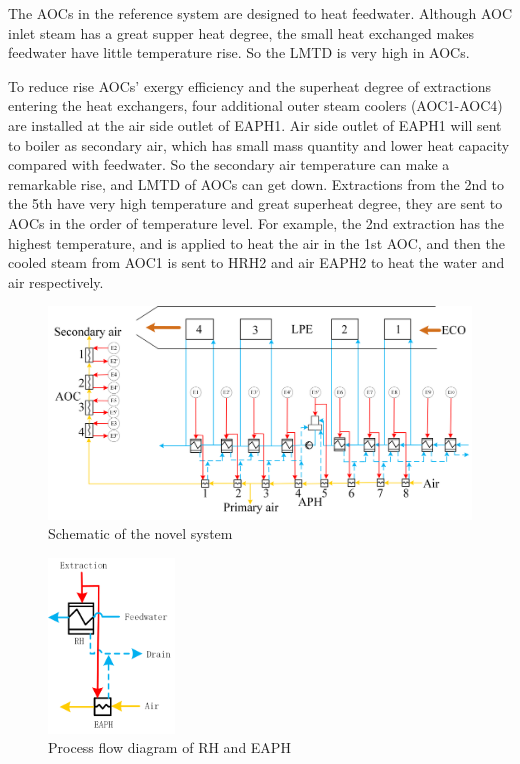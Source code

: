 \documentclass[preprint,12pt]{elsarticle}
\begin{document}
The AOCs in the reference system are designed to heat feedwater.
Although AOC inlet steam has a great supper heat degree, the small heat exchanged makes feedwater have little temperature rise.
So the LMTD is very high in AOCs.

To reduce rise AOCs' exergy efficiency and the superheat degree of extractions entering the heat exchangers, four additional outer steam coolers (AOC1-AOC4) are installed at the air side outlet of EAPH1.
Air side outlet of EAPH1 will sent to boiler as secondary air, which has small mass quantity and lower heat capacity compared with feedwater. 
So the secondary air temperature can make a remarkable rise, and LMTD of AOCs can get down.
Extractions from the 2nd to the 5th have very high temperature and great superheat degree, they are sent to AOCs in the order of temperature level.
For example, the 2nd extraction has the highest temperature, and is applied to heat the air in the 1st AOC, and then the cooled steam from AOC1 is sent to HRH2 and air EAPH2 to heat the water and air respectively.  

\begin{figure}[htbp]
\centering
\includegraphics[width=1\textwidth]{fig/novel_system.png}
\caption{Schematic of the novel system} 
\label{fig:novel_system}
\end{figure}

\begin{figure}[htbp]
\centering
\includegraphics[width=0.3\textwidth]{fig/extracion_heat_APH.png}%
\caption{Process flow diagram of RH and EAPH} 
\label{fig:extraction_heat_APH}
\end{figure}
\end{document}
